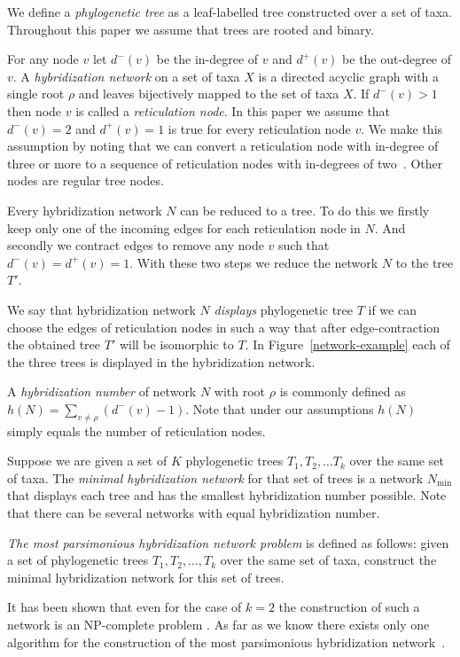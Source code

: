 \documentclass[runningheads, envcountsame, a4paper]{llncs}
\begin{document}
We define a \emph{phylogenetic tree} as a leaf-labelled tree constructed over a set of taxa. 
Throughout this paper we assume that trees are rooted and binary.

For any node $v$ let $d^-(v)$ be the in-degree of $v$ and $d^+(v)$ be the out-degree of $v$.
A \emph{hybridization network} on a set of taxa $X$ is a directed acyclic graph 
with a single root $\rho$ and leaves bijectively mapped to the set of taxa $X$. If $d^-(v) > 1$ then 
node $v$ is called a \emph{reticulation node}. In this paper we assume that $d^-(v) = 2$ and $d^+(v) = 1$ is true for every reticulation node $v$.
We make this assumption by noting that we can convert a reticulation node with in-degree 
of three or more to a sequence of reticulation nodes with in-degrees of two~\cite{wu2010close}. Other nodes are regular 
tree nodes.

Every hybridization network $N$ can be reduced to a tree. To do this we firstly keep only one of the incoming edges for each reticulation node in $N$. 
And secondly we contract edges to remove any node $v$ such that $d^-(v) = d^+(v) = 1$. With these two steps we reduce the network $N$ 
to the tree $T'$.

We say that hybridization network $N$ \emph{displays} phylogenetic tree $T$ 
if we can choose the edges of reticulation nodes in such a way that after edge-contraction the obtained tree $T'$ will be 
isomorphic to $T$. In Figure~\ref{network-example} each of the three trees is displayed in the hybridization network.

A \emph{hybridization number} of network $N$ with root $\rho$ is commonly defined as $h(N) = \sum\limits_{v \ne \rho} (d^-(v) - 1)$.
Note that under our assumptions $h(N)$ simply equals the number of reticulation nodes.

Suppose we are given a set of $K$ phylogenetic trees $T_1, T_2, \dots T_k$ over the same set of taxa. The \emph{minimal 
hybridization network} for that set of trees is a network $N\mathrm{_{min}}$ that displays each tree and has the smallest 
hybridization number possible. Note that there can be several networks with equal hybridization number.

\emph{The most parsimonious hybridization network problem} is defined as follows:
given a set of phylogenetic trees $T_1, T_2, \dots, T_k$ over the same set of taxa, construct the minimal hybridization 
network for this set of trees.

It has been shown that even for the case of $k=2$ the construction of such a network is an NP-complete problem 
\cite {bordewich2007computing}. As far as we know there exists only one algorithm for the construction of the most 
parsimonious hybridization network~\cite{wu2013algorithm}.
\end{document}
